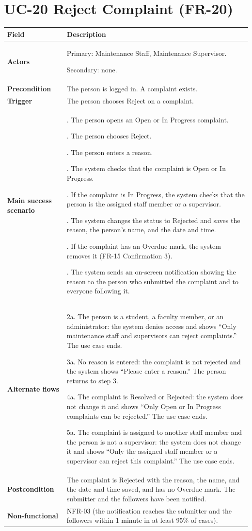 \documentclass[11pt,a4paper]{report}
\begin{document}
\section{UC-20 Reject Complaint (FR-20)}
\begin{longtable}{|>{\raggedright\arraybackslash}p{3.0cm}|>{\raggedright\arraybackslash}p{12.4cm}|}
\hline \textbf{Field} & \textbf{Description} \\ \hline \endhead
\textbf{Actors} & Primary: Maintenance Staff, Maintenance Supervisor.\par\smallskip Secondary: none. \\ \hline
\textbf{Precondition} & The person is logged in. A complaint exists. \\ \hline
\textbf{Trigger} & The person chooses Reject on a complaint. \\ \hline
\textbf{Main success scenario} & 1. The person opens an Open or In Progress complaint.\par\smallskip 2. The person chooses Reject.\par\smallskip 3. The person enters a reason.\par\smallskip 4. The system checks that the complaint is Open or In Progress.\par\smallskip 5. If the complaint is In Progress, the system checks that the person is the assigned staff member or a supervisor.\par\smallskip 6. The system changes the status to Rejected and saves the reason, the person's name, and the date and time.\par\smallskip 7. If the complaint has an Overdue mark, the system removes it (FR-15 Confirmation 3).\par\smallskip 8. The system sends an on-screen notification showing the reason to the person who submitted the complaint and to everyone following it. \\ \hline
\textbf{Alternate flows} & 2a. The person is a student, a faculty member, or an administrator: the system denies access and shows ``Only maintenance staff and supervisors can reject complaints.'' The use case ends.\par\smallskip 3a. No reason is entered: the complaint is not rejected and the system shows ``Please enter a reason.'' The person returns to step 3.\par\smallskip 4a. The complaint is Resolved or Rejected: the system does not change it and shows ``Only Open or In Progress complaints can be rejected.'' The use case ends.\par\smallskip 5a. The complaint is assigned to another staff member and the person is not a supervisor: the system does not change it and shows ``Only the assigned staff member or a supervisor can reject this complaint.'' The use case ends. \\ \hline
\textbf{Postcondition} & The complaint is Rejected with the reason, the name, and the date and time saved, and has no Overdue mark. The submitter and the followers have been notified. \\ \hline
\textbf{Non-functional} & NFR-03 (the notification reaches the submitter and the followers within 1 minute in at least 95\% of cases). \\ \hline
\end{longtable}
\end{document}
